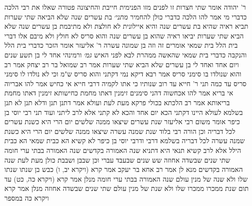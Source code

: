 \documentclass[12pt, openany]{book}
\begin{document}
{ר' יהודה אומר שתי חצרות זו לפנים מזו הפנימית חייבת והחיצונה פטורה 
שאלו את רבי הלכה כדברי מי אמר להו הלכה כדברי כולן להחמיר
{\large\emph{מתני׳}} בת עשרים שנה שלא הביאה שתי שערות תביא ראיה שהיא בת עשרים שנה והיא איילונית לא חולצת ולא מתיבמת
בן עשרים שנה שלא הביא שתי שערות יביאו ראיה שהוא בן עשרים שנה והוא סריס לא חולץ ולא מיבם אלו דברי בית הלל בית שמאי אומרים זה וזה בן שמונה עשרה 
ר' אליעזר אומר הזכר כדברי בית הלל והנקבה כדברי בית שמאי שהאשה ממהרת לבא לפני האיש
{\large\emph{גמ׳}} ורמינהי אחד לי בן תשע שנים ויום אחד ואחד לי בן עשרים שלא הביא שתי שערות 
אמר רב שמואל בר רב יצחק אמר רב והוא שנולדו בו סימני סריס אמר רבא דיקא נמי דקתני והוא סריס ש"מ 
וכי לא נולדו לו סימני סריס עד כמה תני ר' חייא עד רוב שנותיו 
כי אתו לקמיה דרבי חייא אי כחיש אמר להו אבריוה אי בריא אמר להו אכחשוה דהני סימנים זימנין דאתו מחמת כחישותא זימנין דאתו מחמת בריאותא 
אמר רב הלכתא בכולי פרקא מעת לעת ועולא אמר דתנן תנן ודלא תנן לא תנן 
בשלמא לעולא היינו דקתני הכא יום אחד והכא לא קתני אלא לרב ליתני 
ועוד תני רבי יוסי בן כיפר אומר משום רבי אליעזר שנת עשרים שיצאו ממנה שלשים יום הרי היא כשנת עשרים לכל דבריה וכן הורה רבי בלוד שנת שמנה עשרה שיצאו ממנה שלשים יום הרי היא כשנת שמנה עשרה לכל דבריה 
בשלמא דרבי ודרבי יוסי בן כיפר לא קשיא הא כבית שמאי הא כבית הילל אלא לרב קשיא 
תנאי היא דתניא שנה האמורה בקדשים שנה האמורה בבתי ערי חומה שתי שנים שבשדה אחוזה
שש שנים שבעבד עברי וכן שבבן ושבבת כולן מעת לעת 
שנה האמורה בקדשים מנא לן אמר רב אחא בר יעקב אמר קרא (ויקרא יב, ו) כבש בן שנתו שנתו שלו ולא שנה של מנין עולם 
שנה האמורה בבתי ערי חומה מנלן אמר קרא (ויקרא כה, כט) עד תום שנת ממכרו ממכרו שלו ולא שנת של מנין עולם שתי שנים שבשדה אחוזה מנלן אמר קרא {ויקרא כה } במספר}
\end{document}
